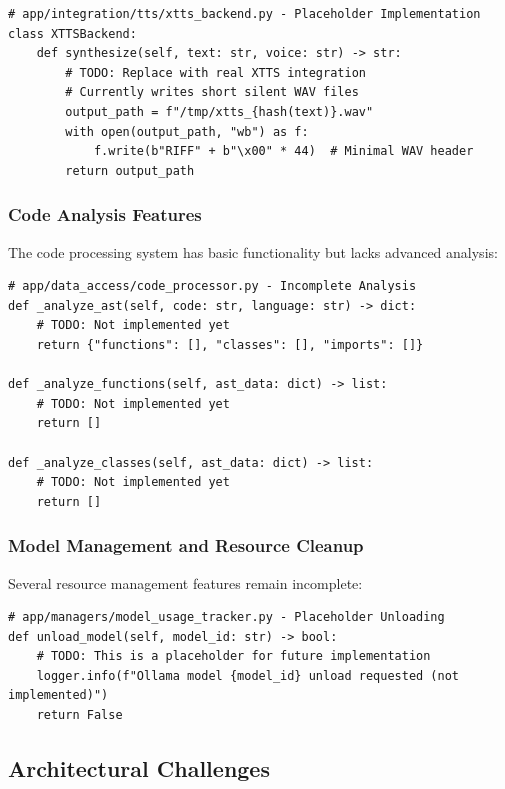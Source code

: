 \documentclass[11pt]{article}
\begin{document}
\begin{lstlisting}[style=python]
# app/integration/tts/xtts_backend.py - Placeholder Implementation
class XTTSBackend:
    def synthesize(self, text: str, voice: str) -> str:
        # TODO: Replace with real XTTS integration
        # Currently writes short silent WAV files
        output_path = f"/tmp/xtts_{hash(text)}.wav"
        with open(output_path, "wb") as f:
            f.write(b"RIFF" + b"\x00" * 44)  # Minimal WAV header
        return output_path
\end{lstlisting}

\subsubsection{Code Analysis Features}

The code processing system has basic functionality but lacks advanced analysis:

\begin{lstlisting}[style=python]
# app/data_access/code_processor.py - Incomplete Analysis
def _analyze_ast(self, code: str, language: str) -> dict:
    # TODO: Not implemented yet
    return {"functions": [], "classes": [], "imports": []}

def _analyze_functions(self, ast_data: dict) -> list:
    # TODO: Not implemented yet
    return []

def _analyze_classes(self, ast_data: dict) -> list:
    # TODO: Not implemented yet
    return []
\end{lstlisting}

\subsubsection{Model Management and Resource Cleanup}

Several resource management features remain incomplete:

\begin{lstlisting}[style=python]
# app/managers/model_usage_tracker.py - Placeholder Unloading
def unload_model(self, model_id: str) -> bool:
    # TODO: This is a placeholder for future implementation
    logger.info(f"Ollama model {model_id} unload requested (not implemented)")
    return False
\end{lstlisting}

\subsection{Architectural Challenges}
\end{document}
